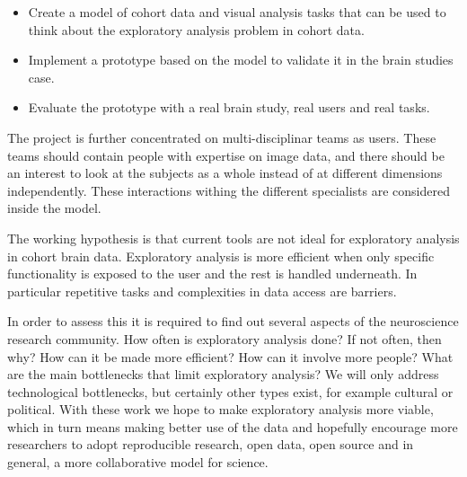 \begin{itemize}
\item Create a model of cohort data and visual analysis tasks that can be used to think about the exploratory analysis problem in cohort data.

\item Implement a prototype based on the model to validate it in the brain studies case.

\item Evaluate the prototype with a real brain study, real users and real tasks.

\end{itemize}

The project is further concentrated on multi-disciplinar teams as users. These teams should contain people with expertise on image data, and there should be an interest to look at the subjects as a whole instead of at different dimensions independently. These interactions withing the different specialists are considered inside the model. 

The working hypothesis is that  current tools are not ideal for exploratory analysis in cohort brain data. Exploratory analysis is more efficient when only specific functionality is exposed to the user and the rest is handled underneath. In particular repetitive tasks and complexities in data access are barriers. 

In order to assess this it is required to find out several aspects of the neuroscience research community. How often is exploratory analysis done? If not often, then why? How can it be made more efficient? How can it involve more people? What are the main bottlenecks that limit exploratory analysis? We will only address technological bottlenecks, but certainly other types exist, for example cultural or political. With these work we hope to make exploratory analysis more viable, which in turn means making better use of the data and hopefully encourage more researchers to adopt reproducible research, open data, open source and in general, a more collaborative model for science.









